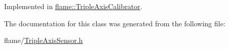 Implemented in \hyperlink{classflame_1_1_triple_axis_calibrator_ab66474b4d1f8f6e9c2ee76233a927e71}{flame\-::\-Triple\-Axis\-Calibrator}.



The documentation for this class was generated from the following file\-:\begin{DoxyCompactItemize}
\item 
flame/\hyperlink{_triple_axis_sensor_8h}{Triple\-Axis\-Sensor.\-h}\end{DoxyCompactItemize}
